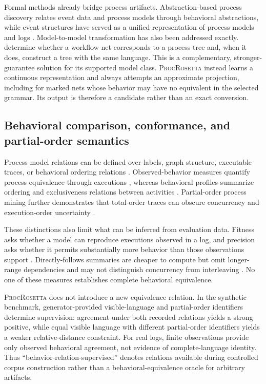 \documentclass[pdflatex,sn-basic]{sn-jnl}
\newcommand{\model}{\textsc{ProcRosetta}\xspace}
\begin{document}
Formal methods already bridge process artifacts. Abstraction-based process discovery relates event data and process models through behavioral abstractions, while event structures have served as a unified representation of process models and logs \citep{vanDerAalst2018Abstractions,Dumas2015EventStructures}. Model-to-model transformation has also been addressed exactly. \citet{vanZelst2020NetToTree} determine whether a workflow net corresponds to a process tree and, when it does, construct a tree with the same language. This is a complementary, stronger-guarantee solution for its supported model class. \model instead learns a continuous representation and always attempts an approximate projection, including for marked nets whose behavior may have no equivalent in the selected grammar. Its output is therefore a candidate rather than an exact conversion.

\subsection{Behavioral comparison, conformance, and partial-order semantics}

Process-model relations can be defined over labels, graph structure, executable traces, or behavioral ordering relations \citep{Dijkman2011,Schoknecht2017SimilaritySurvey,Zampino2026BehavioralSimilarity}. Observed-behavior measures quantify process equivalence through executions \citep{deMedeiros2008ObservedBehavior}, whereas behavioral profiles summarize ordering and exclusiveness relations between activities \citep{Weidlich2011BehavioralProfiles}. Partial-order process mining further demonstrates that total-order traces can obscure concurrency and execution-order uncertainty \citep{Leemans2023PartialOrderSurvey}.

These distinctions also limit what can be inferred from evaluation data. Fitness asks whether a model can reproduce executions observed in a log, and precision asks whether it permits substantially more behavior than those observations support \citep{Adriansyah2013}. Directly-follows summaries are cheaper to compute but omit longer-range dependencies and may not distinguish concurrency from interleaving \citep{vanDerAalst2019DFG}. No one of these measures establishes complete behavioral equivalence.

\model does not introduce a new equivalence relation. In the synthetic benchmark, generator-provided visible-language and partial-order identifiers determine supervision: agreement under both recorded relations yields a strong positive, while equal visible language with different partial-order identifiers yields a weaker relative-distance constraint. For real logs, finite observations provide only observed behavioral agreement, not evidence of complete-language identity. Thus ``behavior-relation-supervised'' denotes relations available during controlled corpus construction rather than a behavioral-equivalence oracle for arbitrary artifacts.
\end{document}
